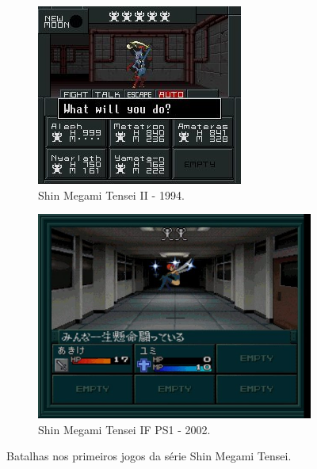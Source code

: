 \documentclass[
	12pt,				%
	openright,			%
	twoside,			%
	a4paper,			%
	english,			%
	french,				%
	spanish,			%
	brazil				%
	]{abntex2}
\begin{document}
\begin{figure}[h!]
\begin{subfigure}[b]{0.4\linewidth}
  \end{subfigure}
  \begin{subfigure}[b]{0.4\linewidth}
    \includegraphics[width=\linewidth]{smt2b.jpg}
    \caption{Shin Megami Tensei II - 1994.}
  \end{subfigure}
  \begin{subfigure}[b]{0.4\linewidth}
    \includegraphics[width=\linewidth]{smtifb.jpg}
    \caption{Shin Megami Tensei IF PS1 - 2002.}
  \end{subfigure}
  \caption{Batalhas nos primeiros jogos da série Shin Megami Tensei.}
  \label{fig:smtb}
\end{figure}
\end{document}
